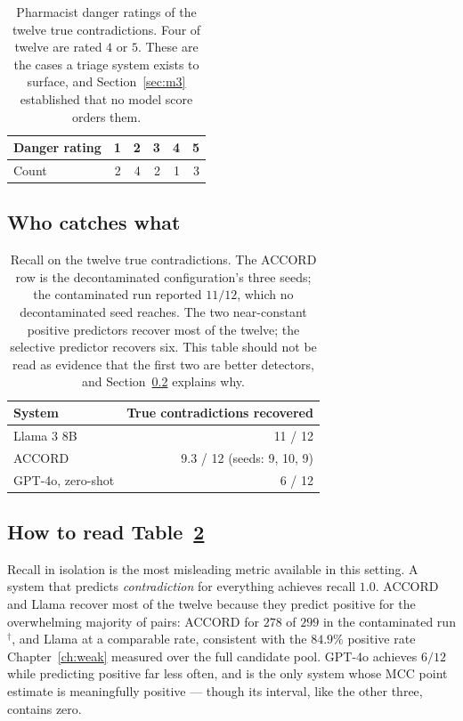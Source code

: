 \begin{table}[t]
\centering
\small
\begin{tabular}{lrrrrr}
\toprule
\textbf{Danger rating} & \textbf{1} & \textbf{2} & \textbf{3} & \textbf{4} & \textbf{5} \\
\midrule
Count & 2 & 4 & 2 & 1 & 3 \\
\bottomrule
\end{tabular}
\caption{Pharmacist danger ratings of the twelve true contradictions. Four of
twelve are rated $4$ or $5$. These are the cases a triage system exists to
surface, and Section~\ref{sec:m3} established that no model score orders them.}
\label{tab:danger}
\end{table}

\subsection{Who catches what}

\begin{table}[h]
\centering
\small
\begin{tabular}{lr}
\toprule
\textbf{System} & \textbf{True contradictions recovered} \\
\midrule
Llama 3 8B          & 11 / 12 \\
ACCORD              & 9.3 / 12 (seeds: 9, 10, 9) \\
GPT-4o, zero-shot   & 6 / 12 \\
\bottomrule
\end{tabular}
\caption{Recall on the twelve true contradictions. The ACCORD row is the
decontaminated configuration's three seeds; the contaminated run reported
$11/12$, which no decontaminated seed reaches. The two near-constant positive
predictors recover most of the twelve; the selective predictor recovers six. This
table should not be read as evidence that the first two are better detectors,
and Section~\ref{sec:errors-reading} explains why.}
\label{tab:recall}
\end{table}

\subsection{How to read Table~\ref{tab:recall}}
\label{sec:errors-reading}

Recall in isolation is the most misleading metric available in this setting. A
system that predicts \emph{contradiction} for everything achieves recall
$1.0$. ACCORD and Llama recover most of the twelve because they predict positive
for the overwhelming majority of pairs: ACCORD for $278$ of $299$ in the
contaminated run$^{\dagger}$, and Llama at a comparable rate, consistent with the
$84.9\%$ positive rate Chapter~\ref{ch:weak} measured over the full candidate
pool. GPT-4o achieves $6/12$ while predicting positive far less often, and is the
only system whose MCC point estimate is meaningfully positive --- though its
interval, like the other three, contains zero.

